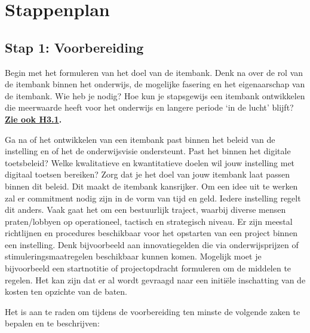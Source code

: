 \documentclass[
]{book}
\begin{document}
\hypertarget{stappenplan-1}{%
\chapter{Stappenplan}\label{stappenplan-1}}

\hypertarget{stap-1-voorbereiding}{%
\section{Stap 1: Voorbereiding}\label{stap-1-voorbereiding}}

Begin met het formuleren van het doel van de itembank. Denk na over de rol van de itembank binnen het onderwijs, de mogelijke fasering en het eigenaarschap van de itembank. Wie heb je nodig? Hoe kun je stapsgewijs een itembank ontwikkelen die meerwaarde heeft voor het onderwijs en langere periode `in de lucht' blijft? \textbf{\protect\hyperlink{waarom-samenwerken-aan-een-itembank}{Zie ook H3.1}.}

Ga na of het ontwikkelen van een itembank past binnen het beleid van de instelling en of het de onderwijsvisie ondersteunt. Past het binnen het digitale toetsbeleid? Welke kwalitatieve en kwantitatieve doelen wil jouw instelling met digitaal toetsen bereiken? Zorg dat je het doel van jouw itembank laat passen binnen dit beleid. Dit maakt de itembank kansrijker. Om een idee uit te werken zal er commitment nodig zijn in de vorm van tijd en geld. Iedere instelling regelt dit anders. Vaak gaat het om een bestuurlijk traject, waarbij diverse mensen praten/lobbyen op operationeel, tactisch en strategisch niveau. Er zijn meestal richtlijnen en procedures beschikbaar voor het opstarten van een project binnen een instelling. Denk bijvoorbeeld aan innovatiegelden die via onderwijsprijzen of stimuleringsmaatregelen beschikbaar kunnen komen. Mogelijk moet je bijvoorbeeld een startnotitie of projectopdracht formuleren om de middelen te regelen. Het kan zijn dat er al wordt gevraagd naar een initiële inschatting van de kosten ten opzichte van de baten.

Het is aan te raden om tijdens de voorbereiding ten minste de volgende zaken te bepalen en te beschrijven:
\end{document}
